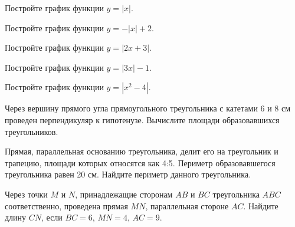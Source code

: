 \begin{consultation}[number=7]
	\begin{listofex}
		\item Постройте график функции \( y=|x| \).
		\item Постройте график функции \( y=-|x|+2 \).
		\item Постройте график функции \( y=|2x+3| \).
		\item Постройте график функции \( y=|3x|-1 \).
		\item Постройте график функции \( y=|x^{2}-4| \).
		\item Через вершину прямого угла прямоугольного треугольника с катетами 6 и 8 см проведен перпендикуляр к гипотенузе. Вычислите площади образовавшихся треугольников.
		\item Прямая, параллельная основанию треугольника, делит его на треугольник и трапецию, площади которых относятся как 4:5. Периметр образовавшегося треугольника равен 20 см. Найдите периметр данного треугольника.
		\item Через точки \( M \) и \( N \), принадлежащие сторонам \( AB \) и \( BC \) треугольника \( ABC \) соответственно, проведена прямая \( MN \), параллельная стороне \( AC \). Найдите длину \( CN \), если \( BC = 6 \), \( MN = 4 \), \( AC = 9 \).
	\end{listofex}
\end{consultation}



